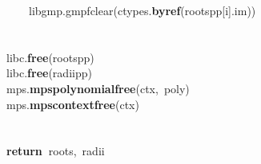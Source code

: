 \documentclass{article}\usepackage[]{graphicx}\usepackage[dvipsnames,table]{xcolor}
\makeatletter
\newcommand{\hlnum}[1]{\textcolor[rgb]{0.686,0.059,0.569}{#1}}%
\newcommand{\hlopt}[1]{\textcolor[rgb]{0,0,0}{#1}}%
\newcommand{\hldef}[1]{\textcolor[rgb]{0.345,0.345,0.345}{#1}}%
\newcommand{\hlkwa}[1]{\textcolor[rgb]{0.161,0.373,0.58}{\textbf{#1}}}%
\newcommand{\hlkwd}[1]{\textcolor[rgb]{0.737,0.353,0.396}{\textbf{#1}}}%
\newenvironment{kframe}{%
 \def\at@end@of@kframe{}%
 \ifinner\ifhmode%
  \def\at@end@of@kframe{\end{minipage}}%
  \begin{minipage}{\columnwidth}%
 \fi\fi%
 \def\FrameCommand##1{\hskip\@totalleftmargin \hskip-\fboxsep
 \colorbox{shadecolor}{##1}\hskip-\fboxsep
     \hskip-\linewidth \hskip-\@totalleftmargin \hskip\columnwidth}%
 \MakeFramed {\advance\hsize-\width
   \@totalleftmargin\z@ \linewidth\hsize
   \@setminipage}}%
 {\par\unskip\endMakeFramed%
 \at@end@of@kframe}
\newenvironment{knitrout}{}{} %
\makeatother
\begin{document}
\begin{center}
\begin{minipage}[m]{18cm}
\begin{knitrout}
\begin{kframe}
\hldef{}\hldef{\ \ \ \ \ \ \ \ }\hldef{\textunderscore libgmp}\hlnum{.\textunderscore \textunderscore }\hldef{gmpf}\hlnum{\textunderscore }\hldef{clear}\hlopt{(}\hldef{ctypes}\hlopt{.}\hldef{}\hlkwd{byref}\hldef{}\hlopt{(}\hldef{roots\textunderscore pp}\hlopt{{[}}\hldef{i}\hlopt{{]}.}\hldef{im}\hlopt{))}\hspace*{\fill}\\
\hldef{}\hspace*{\fill}\\
\hldef{}\hldef{\ \ \ \ }\hldef{}\hspace*{\fill}\\
\hldef{}\hldef{\ \ \ \ }\hldef{\textunderscore libc}\hlopt{.}\hldef{}\hlkwd{free}\hldef{}\hlopt{(}\hldef{roots\textunderscore pp}\hlopt{)}\hspace*{\fill}\\
\hldef{}\hldef{\ \ \ \ }\hldef{\textunderscore libc}\hlopt{.}\hldef{}\hlkwd{free}\hldef{}\hlopt{(}\hldef{radii\textunderscore pp}\hlopt{)}\hspace*{\fill}\\
\hldef{}\hldef{\ \ \ \ }\hldef{\textunderscore mps}\hlopt{.}\hldef{}\hlkwd{mps\textunderscore polynomial\textunderscore free}\hldef{}\hlopt{(}\hldef{ctx}\hlopt{,\ }\hldef{poly}\hlopt{)}\hspace*{\fill}\\
\hldef{}\hldef{\ \ \ \ }\hldef{\textunderscore mps}\hlopt{.}\hldef{}\hlkwd{mps\textunderscore context\textunderscore free}\hldef{}\hlopt{(}\hldef{ctx}\hlopt{)}\hspace*{\fill}\\
\hldef{}\hspace*{\fill}\\
\hldef{}\hldef{\ \ \ \ }\hldef{}\hspace*{\fill}\\
\hldef{}\hldef{\ \ \ \ }\hldef{}\hlkwa{return\ }\hldef{roots}\hlopt{,\ }\hldef{radii}\hspace*{\fill}
\mbox{}
\normalfont
\end{kframe}
\end{knitrout}
\end{minipage}
\end{center}


\newpage
\end{document}
